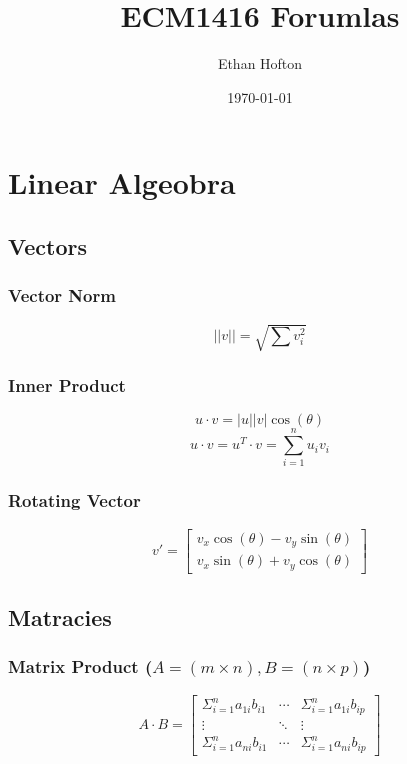 \documentclass{article}
\title{ECM1416 Forumlas}
\author{Ethan Hofton}
\date{\today}
\begin{document}
    \maketitle

    \tableofcontents

    \section{Linear Algeobra}

        \subsection{Vectors}

        \subsubsection{Vector Norm}
        \begin{equation}
            ||v|| = \sqrt{\sum{v^2_i}}
        \end{equation}

        \subsubsection{Inner Product}
        \begin{equation}
            u \cdot v = |u||v|\cos(\theta)
        \end{equation}
        \begin{equation}
            u \cdot v = u^T \cdot v = \sum^{n}_{i=1}{u_iv_i}
        \end{equation}

        \subsubsection{Rotating Vector}
        \begin{equation}
            v' = \begin{bmatrix} v_x \cos(\theta) - v_y \sin(\theta) \\ v_x \sin(\theta) + v_y \cos(\theta) \end{bmatrix}
        \end{equation}

        \subsection{Matracies}

        \subsubsection{Matrix Product ($ A=(m \times n), B=(n \times p) $)}
        \begin{equation}
            A \cdot B = \begin{bmatrix} \Sigma^n_{i=1}{a_{1i}b_{i1}} & \cdots & \Sigma^n_{i=1}{a_{1i}b_{ip}} \\
            \vdots & \ddots & \vdots \\ 
            \Sigma^n_{i=1}{a_{ni}b_{i1}} & \cdots & \Sigma^n_{i=1}{a_{ni}b_{ip}} \end{bmatrix}
        \end{equation}
\end{document}
